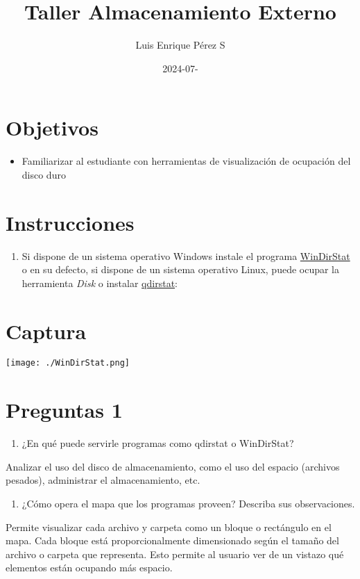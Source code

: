 \documentclass{article}
\author{Luis Enrique Pérez S}
\date{2024-07-}
\title{Taller Almacenamiento Externo}
\begin{document}
\maketitle
{}
\thispagestyle{fancy}


\section{Objetivos}
\label{sec:org906b069}

\begin{itemize}
\item Familiarizar al estudiante con herramientas de visualización de ocupación del disco duro
\end{itemize}

\section{Instrucciones}
\label{sec:org63d7c20}
\begin{enumerate}
\item Si dispone de un sistema operativo Windows instale el programa
\href{https://windirstat.net/download.html}{WinDirStat} o en su defecto, si dispone de un sistema operativo
Linux, puede ocupar la herramienta \emph{Disk} o instalar \href{https://installati.one/install-qdirstat-ubuntu-20-04/}{qdirstat}:
\end{enumerate}

\section{Captura}
\label{sec:orgc041e26}
\begin{center}
\texttt{[image: ./WinDirStat.png]}
\end{center}

\section{Preguntas 1}
\label{sec:orgcfa1f5f}
\begin{enumerate}
\item ¿En qué puede servirle programas como qdirstat o WinDirStat?
\end{enumerate}
Analizar el uso del disco de almacenamiento, como el uso del espacio (archivos pesados), administrar el almacenamiento, etc.
\begin{enumerate}
\item ¿Cómo opera el mapa que los programas proveen? Describa sus observaciones.
\end{enumerate}
Permite visualizar cada archivo y carpeta como un bloque o rectángulo en el mapa. Cada bloque está proporcionalmente dimensionado según el tamaño del archivo o carpeta que representa. Esto permite al usuario ver de un vistazo qué elementos están ocupando más espacio.
\end{document}
